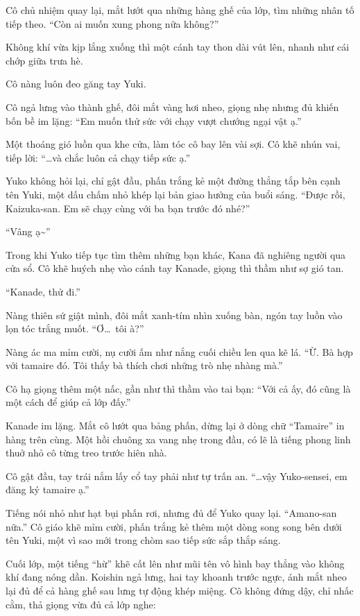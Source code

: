 \documentclass[../main.tex]{subfiles}
\begin{document}
Cô chủ nhiệm quay lại, mắt lướt qua những hàng ghế của lớp, tìm những nhân tố tiếp theo. ``Còn ai muốn xung phong nữa không?''

Không khí vừa kịp lắng xuống thì một cánh tay thon dài vút lên, nhanh như cái chớp giữa trưa hè.

Cô nàng luôn đeo găng tay Yuki.

Cô ngả lưng vào thành ghế, đôi mắt vàng hơi nheo, giọng nhẹ nhưng đủ khiến bốn bề im lặng: ``Em muốn thử sức với chạy vượt chướng ngại vật ạ.''

Một thoáng gió luồn qua khe cửa, làm tóc cô bay lên vài sợi. Cô khẽ nhún vai, tiếp lời: ``\dots và chắc luôn cả chạy tiếp sức ạ.''

Yuko không hỏi lại, chỉ gật đầu, phấn trắng kẻ một đường thẳng tắp bên cạnh tên Yuki, một dấu chấm nhỏ khép lại bản giao hưởng của buổi sáng. ``Được rồi, Kaizuka-san. Em sẽ chạy cùng với ba bạn trước đó nhé?''

``Vâng ạ\~{}''

Trong khi Yuko tiếp tục tìm thêm những bạn khác, Kana đã nghiêng người qua cửa sổ. Cô khẽ huých nhẹ vào cánh tay Kanade, giọng thì thầm như sợ gió tan.

``Kanade, thử đi.''

Nàng thiên sứ giật mình, đôi mắt xanh-tím nhìn xuống bàn, ngón tay luồn vào lọn tóc trắng muốt. ``Ơ\dots\ tôi à?''

Nàng ác ma mỉm cười, nụ cười ấm như nắng cuối chiều len qua kẽ lá. ``Ừ. Bà hợp với tamaire đó. Tôi thấy bà thích chơi những trò nhẹ nhàng mà.''

Cô hạ giọng thêm một nấc, gần như thì thầm vào tai bạn: ``Với cả ấy, đó cũng là một cách để giúp cả lớp đấy.''

Kanade im lặng. Mắt cô lướt qua bảng phấn, dừng lại ở dòng chữ ``Tamaire'' in hàng trên cùng. Một hồi chuông xa vang nhẹ trong đầu, có lẽ là tiếng phong linh thuở nhỏ cô từng treo trước hiên nhà.

Cô gật đầu, tay trái nắm lấy cổ tay phải như tự trấn an. ``\dots vậy Yuko-sensei, em đăng ký tamaire ạ.''

Tiếng nói nhỏ như hạt bụi phấn rơi, nhưng đủ để Yuko quay lại. ``Amano-san nữa.''  Cô giáo khẽ mỉm cười, phấn trắng kẻ thêm một dòng song song bên dưới tên Yuki, một vì sao mới trong chòm sao tiếp sức sắp thắp sáng.

Cuối lớp, một tiếng ``hừ'' khẽ cất lên như mũi tên vô hình bay thẳng vào không khí đang nóng dần. Koishin ngả lưng, hai tay khoanh trước ngực, ánh mắt nheo lại đủ để cả hàng ghế sau lưng tự động khép miệng. Cô không đứng dậy, chỉ nhấc cằm, thả giọng vừa đủ cả lớp nghe:
\end{document}

